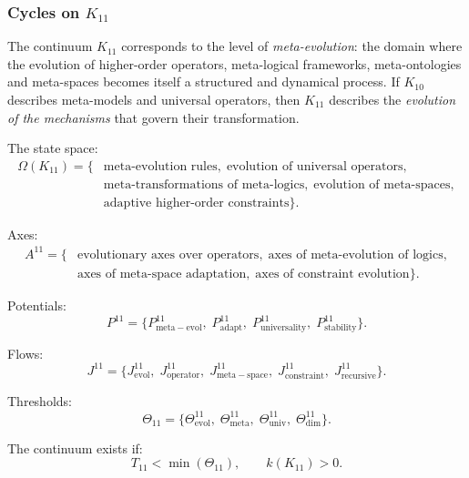 
\subsubsection{Cycles on $K_{11}$}
\label{sec:cycles-k11}

The continuum $K_{11}$ corresponds to the level of \emph{meta-evolution}:
the domain where the evolution of higher-order operators, meta-logical
frameworks, meta-ontologies and meta-spaces becomes itself a structured and
dynamical process. If $K_{10}$ describes meta-models and universal operators,
then $K_{11}$ describes the \emph{evolution of the mechanisms} that govern
their transformation.

The state space:
\[
  \begin{aligned}
  \Omega(K_{11})
  = \{&
    \text{meta-evolution rules},\;
    \text{evolution of universal operators},\\
    &\text{meta-transformations of meta-logics},\;
    \text{evolution of meta-spaces},\\
    &\text{adaptive higher-order constraints}
  \}.
  \end{aligned}
\]

Axes:
\[
  \begin{aligned}
  A^{11}
  = \{&
      \text{evolutionary axes over operators},\;
      \text{axes of meta-evolution of logics},\\
      &\text{axes of meta-space adaptation},\;
      \text{axes of constraint evolution}
    \}.
  \end{aligned}
\]

Potentials:
\[
  P^{11}
  = \{
      P^{11}_{\mathrm{meta\!-\!evol}},\;
      P^{11}_{\mathrm{adapt}},\;
      P^{11}_{\mathrm{universality}},\;
      P^{11}_{\mathrm{stability}}
    \}.
\]

Flows:
\[
  J^{11}
  = \{
      J^{11}_{\mathrm{evol}},\;
      J^{11}_{\mathrm{operator}},\;
      J^{11}_{\mathrm{meta\!-\!space}},\;
      J^{11}_{\mathrm{constraint}},\;
      J^{11}_{\mathrm{recursive}}
    \}.
\]

Thresholds:
\[
  \Theta_{11}
   =
   \{
     \Theta^{11}_{\mathrm{evol}},\;
     \Theta^{11}_{\mathrm{meta}},\;
     \Theta^{11}_{\mathrm{univ}},\;
     \Theta^{11}_{\mathrm{dim}}
   \}.
\]

The continuum exists if:
\[
  T_{11} < \min(\Theta_{11}), \qquad k(K_{11})>0.
\]


